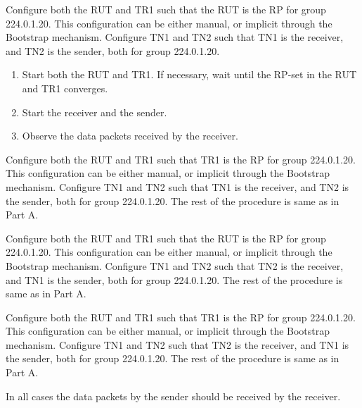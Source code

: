 \documentclass[11pt]{report}
\begin{document}


Configure both the RUT and TR1 such that the RUT is the RP for group
224.0.1.20. This configuration can be either manual, or implicit through the
Bootstrap mechanism. Configure TN1 and TN2 such that TN1 is the receiver, and
TN2 is the sender, both for group 224.0.1.20.

\begin{enumerate}

  \item Start both the RUT and TR1. If necessary, wait until the RP-set in the
        RUT and TR1 converges.

  \item Start the receiver and the sender.

  \item Observe the data packets received by the receiver.

\end{enumerate}


Configure both the RUT and TR1 such that TR1 is the RP for group
224.0.1.20. This configuration can be either manual, or implicit through the
Bootstrap mechanism. Configure TN1 and TN2 such that TN1 is the receiver, and
TN2 is the sender, both for group 224.0.1.20. The rest of the procedure is
same as in Part A.


Configure both the RUT and TR1 such that the RUT is the RP for group
224.0.1.20. This configuration can be either manual, or implicit through the 
Bootstrap mechanism. Configure TN1 and TN2 such that TN2 is the receiver, and
TN1 is the sender, both for group 224.0.1.20. The rest of the procedure is
same as in Part A.


Configure both the RUT and TR1 such that TR1 is the RP for group
224.0.1.20. This configuration can be either manual, or implicit through the
Bootstrap mechanism. Configure TN1 and TN2 such that TN2 is the receiver, and
TN1 is the sender, both for group 224.0.1.20. The rest of the procedure is
same as in Part A.

In all cases the data packets by the sender should be received by the
receiver.
\end{document}
